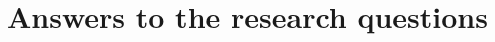 %
%
%
%
\label{chap:discussion}

\section{Answers to the research questions}
\label{sec:disc-answers}

